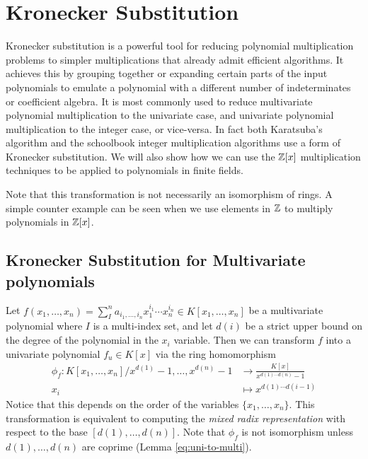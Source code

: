 \section{Kronecker Substitution}%
\label{sub:kronecker_substitution}

Kronecker substitution is a powerful tool for reducing polynomial multiplication problems to simpler multiplications that already admit efficient algorithms. It achieves this by grouping together or expanding certain parts of the input polynomials to emulate a polynomial with a different number of indeterminates or coefficient algebra. It is most commonly used to reduce multivariate polynomial multiplication to the univariate case, and univariate polynomial multiplication to the integer case, or vice-versa. In fact both Karatsuba's algorithm and the schoolbook integer multiplication algorithms use a form of Kronecker substitution. We will also show how we can use the ${\mathbb Z}[x]$ multiplication techniques to be applied to polynomials in finite fields.

Note that this transformation is not necessarily an isomorphism of rings. A simple counter example can be seen when we use elements in ${\mathbb Z}$ to multiply polynomials in ${\mathbb Z}[x]$.

\medskip

\subsection{Kronecker Substitution for Multivariate polynomials}

Let $f(x_1, \ldots, x_n) = \sum^n_{I}a_{i_1, \ldots, i_n}x_1^{i_1}\cdots x_n^{i_n} \in K[x_1, \ldots, x_n]$ be a multivariate polynomial where $I$ is a multi-index set, and let $d(i)$ be a strict upper bound on the degree of the polynomial in the $x_i$ variable. Then we can transform $f$ into a univariate polynomial $f_u \in K[x]$ via the ring homomorphism
\begin{align*}
    \phi_f: K[x_1, \ldots, x_n]/{x^{d(1)} - 1, \ldots, x^{d(n)} - 1} &\to \frac{K[x]}{x^{d(1) \cdots d(n)} - 1}\\
    x_i &\mapsto x^{d(1) \cdots d(i-1)}
\end{align*}
Notice that this depends on the order of the variables $\{x_1, \ldots, x_n\}$. This transformation is equivalent to computing the \emph{mixed radix representation} with respect to the base $[d(1), \ldots, d(n)]$. Note that $\phi_f$ is not isomorphism unless $d(1), \ldots, d(n)$ are coprime (Lemma \ref{eq:uni-to-multi}).

